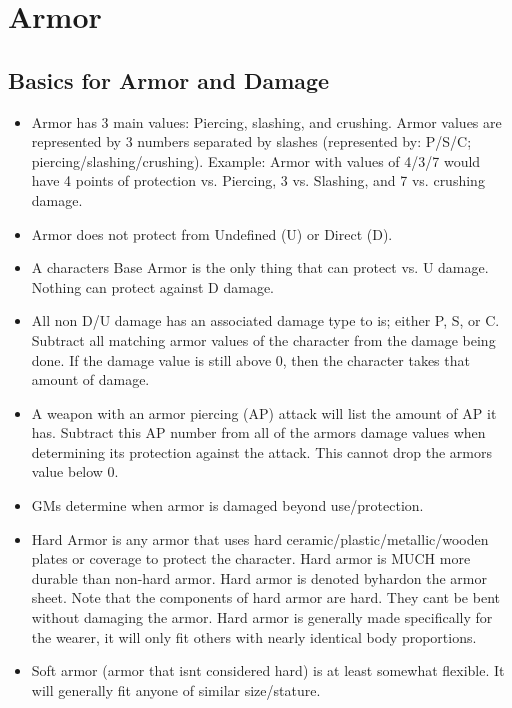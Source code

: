 \documentclass[twoside]{book}
\begin{document}
    

\section{Armor}
    
    

\subsection{Basics for Armor and Damage}
    
\begin{itemize}
      
  \item Armor has 3 main values: Piercing, slashing, and crushing. Armor values are represented by 3 numbers separated by slashes (represented by: P/S/C; piercing/slashing/crushing). Example: Armor with values of 4/3/7 would have 4 points of protection vs. Piercing, 3 vs. Slashing, and 7 vs. crushing damage.
  \item Armor does not protect from Undefined (U) or Direct (D).
  \item A characters Base Armor is the only thing that can protect vs. U damage. Nothing can protect against D damage.
  \item All non D/U damage has an associated damage type to is; either P, S, or C. Subtract all matching armor values of the character from the damage being done. If the damage value is still above 0, then the character takes that amount of damage.
  \item A weapon with an armor piercing (AP) attack will list the amount of AP it has. Subtract this AP number from all of the armors damage values when determining its protection against the attack. This cannot drop the armors value below 0.
  \item GMs determine when armor is damaged beyond use/protection.
  \item Hard Armor is any armor that uses hard ceramic/plastic/metallic/wooden plates or coverage to protect the character. Hard armor is MUCH more durable than non-hard armor. Hard armor is denoted byhardon the armor sheet. Note that the components of hard armor are hard. They cant be bent without damaging the armor. Hard armor is generally made specifically for the wearer, it will only fit others with nearly identical body proportions.
  \item Soft armor (armor that isnt considered hard) is at least somewhat flexible. It will generally fit anyone of similar size/stature.

\end{itemize}
\end{document}
